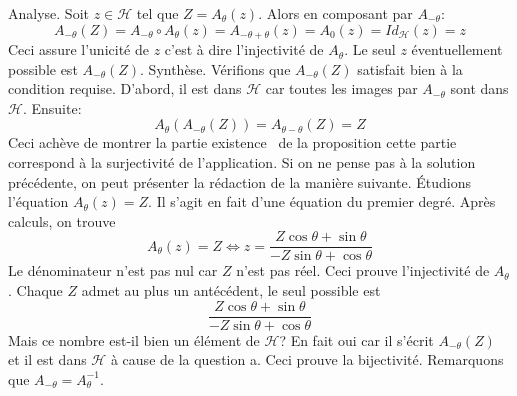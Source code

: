 \begin{enumerate}
\begin{enumerate}
Analyse.\newline
Soit $z \in \mathcal{H}$ tel que $Z=A_\theta(z)$. Alors en composant par $A_{-\theta}$:
\begin{displaymath}
  A_{-\theta}(Z) = A_{-\theta}\circ A_{\theta}(z) = A_{-\theta + \theta}(z) = A_0(z) = Id_{\mathcal{H}}(z)=z
\end{displaymath}
Ceci assure l'unicité de $z$ c'est à dire l'injectivité de $A_\theta$. Le seul $z$ éventuellement possible est $A_{-\theta}(Z)$.\newline
Synthèse.\newline
Vérifions que $A_{-\theta}(Z)$ satisfait bien à la condition requise.\newline
D'abord, il est dans $\mathcal{H}$ car toutes les images par $A_{-\theta}$ sont dans $\mathcal{H}$. Ensuite:
\begin{displaymath}
  A_\theta\left( A_{-\theta}(Z)\right) = A_{\theta - \theta}(Z) = Z
\end{displaymath}
Ceci achève de montrer la partie \og existence\fg~ de la proposition cette partie correspond à la surjectivité de l'application.\newline
Si on ne pense pas à la solution précédente, on peut présenter la rédaction de la manière suivante.
{\'E}tudions l'{\'e}quation $A_\theta (z)=Z$. Il s'agit en fait d'une équation du premier degré. Apr{\`e}s calculs, on trouve
\begin{displaymath}
 A_\theta (z)=Z\Leftrightarrow z=\frac{Z\cos \theta + \sin \theta}{-Z \sin \theta + \cos \theta}
\end{displaymath}
Le d{\'e}nominateur n'est pas nul car $Z$ n'est pas r{\'e}el. Ceci prouve l'injectivit{\'e} de $A_\theta$. Chaque $Z$ admet au plus un ant{\'e}c{\'e}dent, le seul possible est
\begin{displaymath}
 \frac{Z\cos \theta + \sin \theta}{-Z \sin \theta + \cos \theta}
\end{displaymath}
Mais ce nombre est-il bien un {\'e}l{\'e}ment de $\mathcal{H}$? En fait oui car il s'{\'e}crit $A_{-\theta}(Z)$ et il est dans $\mathcal{H}$ {\`a} cause de la question a. Ceci prouve la
bijectivit{\'e}. Remarquons que $A_{-\theta}=A_\theta ^{-1}$.
\end{enumerate}


\end{enumerate}
